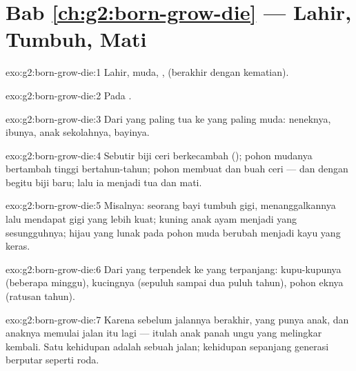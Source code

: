 \section*{Bab \ref{ch:g2:born-grow-die} --- Lahir, Tumbuh, Mati}

\begin{solution}{exo:g2:born-grow-die:1}
Lahir, muda, ,  (berakhir dengan kematian).
\end{solution}

\begin{solution}{exo:g2:born-grow-die:2}
Pada  .
\end{solution}

\begin{solution}{exo:g2:born-grow-die:3}
Dari yang paling tua ke yang paling muda: neneknya, ibunya, anak
sekolahnya, bayinya.
\end{solution}

\begin{solution}{exo:g2:born-grow-die:4}
Sebutir biji ceri berkecambah (); pohon mudanya bertambah
tinggi bertahun-tahun; pohon  membuat  dan buah ceri ---
dan dengan begitu biji baru; lalu ia menjadi tua dan mati.
\end{solution}

\begin{solution}{exo:g2:born-grow-die:5}
Misalnya: seorang bayi tumbuh gigi, menanggalkannya lalu mendapat gigi
yang lebih kuat;  kuning anak ayam menjadi  yang
sesungguhnya;  hijau yang lunak pada pohon muda berubah menjadi
kayu yang keras.
\end{solution}

\begin{solution}{exo:g2:born-grow-die:6}
Dari yang terpendek ke yang terpanjang: kupu-kupunya (beberapa
minggu), kucingnya (sepuluh sampai dua puluh tahun), pohon eknya
(ratusan tahun).
\end{solution}

\begin{solution}{exo:g2:born-grow-die:7}
Karena sebelum jalannya berakhir, yang  punya anak, dan anaknya
memulai jalan itu lagi --- itulah anak panah ungu yang melingkar
kembali. Satu kehidupan adalah sebuah jalan; kehidupan sepanjang
generasi berputar seperti roda.
\end{solution}

